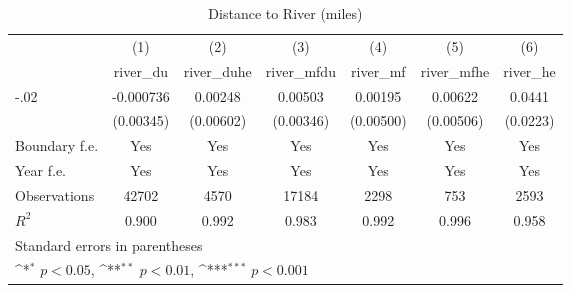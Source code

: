 \begin{table}[htbp]\centering
\def\sym#1{\ifmmode^{#1}\else\(^{#1}\)\fi}
\caption{Distance to River (miles)}
\begin{tabular}{l*{6}{c}}
\hline\hline
                    &\multicolumn{1}{c}{(1)}&\multicolumn{1}{c}{(2)}&\multicolumn{1}{c}{(3)}&\multicolumn{1}{c}{(4)}&\multicolumn{1}{c}{(5)}&\multicolumn{1}{c}{(6)}\\
                    &\multicolumn{1}{c}{river\_du}&\multicolumn{1}{c}{river\_duhe}&\multicolumn{1}{c}{river\_mfdu}&\multicolumn{1}{c}{river\_mf}&\multicolumn{1}{c}{river\_mfhe}&\multicolumn{1}{c}{river\_he}\\
\hline
-.02                &   -0.000736         &     0.00248         &     0.00503         &     0.00195         &     0.00622         &      0.0441         \\
                    &   (0.00345)         &   (0.00602)         &   (0.00346)         &   (0.00500)         &   (0.00506)         &    (0.0223)         \\
[1em]
Boundary f.e.       &         Yes         &         Yes         &         Yes         &         Yes         &         Yes         &         Yes         \\
[1em]
Year f.e.           &         Yes         &         Yes         &         Yes         &         Yes         &         Yes         &         Yes         \\
\hline
Observations        &       42702         &        4570         &       17184         &        2298         &         753         &        2593         \\
\(R^{2}\)           &       0.900         &       0.992         &       0.983         &       0.992         &       0.996         &       0.958         \\
\hline\hline
\multicolumn{7}{l}{\footnotesize Standard errors in parentheses}\\
\multicolumn{7}{l}{\footnotesize \sym{*} \(p<0.05\), \sym{**} \(p<0.01\), \sym{***} \(p<0.001\)}\\
\end{tabular}
\end{table}
